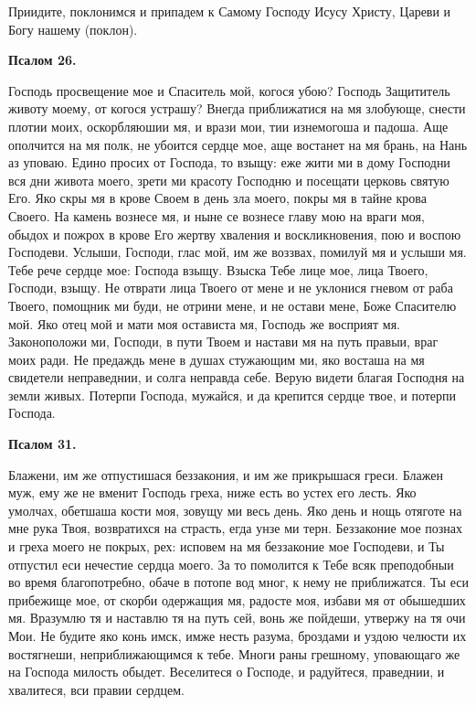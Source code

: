 Приидите, поклонимся и припадем к Самому Господу Исусу Христу, Цареви и Богу нашему (поклон).


\medskip


\bfseries Псалом 26.\normalfont{}\nopagebreak


Господь просвещение мое и Спаситель мой, когося убою? Господь Защититель животу моему, от когося устрашу? Внегда приближатися на мя злобующе, снести плотии моих, оскорбляюшии мя, и врази мои, тии изнемогоша и падоша. Аще ополчится на мя полк, не убоится сердце мое, аще востанет на мя брань, на Нань аз уповаю. Едино просих от Господа, то взыщу: еже жити ми в дому Господни вся дни живота моего, зрети ми красоту Господню и посещати церковь святую Его. Яко скры мя в крове Своем в день зла моего, покры мя в тайне крова Своего. На камень вознесе мя, и ныне се вознесе главу мою на враги моя, обыдох и пожрох в крове Его жертву хваления и воскликновения, пою и воспою Господеви. Услыши, Господи, глас мой, им же воззвах, помилуй мя и услыши мя. Тебе рече сердце мое: Господа взыщу. Взыска Тебе лице мое, лица Твоего, Господи, взыщу. Не отврати лица Твоего от мене и не уклонися гневом от раба Твоего, помощник ми буди, не отрини мене, и не остави мене, Боже Спасителю мой. Яко отец мой и мати моя остависта мя, Господь же восприят мя. Законоположи ми, Господи, в пути Твоем и настави мя на путь правыи,  враг моих ради. Не предаждь мене в душах стужающим ми, яко восташа на мя свидетели неправеднии, и солга неправда себе. Верую видети благая Господня на земли живых. Потерпи Господа, мужайся, и да крепится сердце твое, и потерпи Господа.


\medskip


\bfseries Псалом 31.\normalfont{}\nopagebreak


Блажени, им же отпустишася беззакония, и им же прикрышася греси. Блажен муж, ему же не вменит Господь греха, ниже есть во устех его лесть. Яко умолчах, обетшаша кости моя, зовущу ми весь день. Яко день и нощь отяготе на мне рука Твоя, возвратихся на страсть, егда унзе ми терн. Беззаконие мое познах и греха моего не покрых, рех: исповем на мя беззаконие мое Господеви, и Ты отпустил еси нечестие сердца моего. За то помолится к Тебе всяк преподобныи во время благопотребно, обаче в потопе вод мног, к нему не приближатся. Ты еси прибежище мое, от скорби одержащия мя, радосте моя, избави мя от обышедших мя. Вразумлю тя и наставлю тя на путь сей, вонь же пойдеши, утвержу на тя очи Мои. Не будите яко конь имск, имже несть разума, броздами и уздою челюсти их востягнеши, неприближающимся к тебе. Многи раны грешному, уповающаго же на Господа милость обыдет. Веселитеся о Господе, и радуйтеся, праведнии, и хвалитеся, вси правии сердцем.


